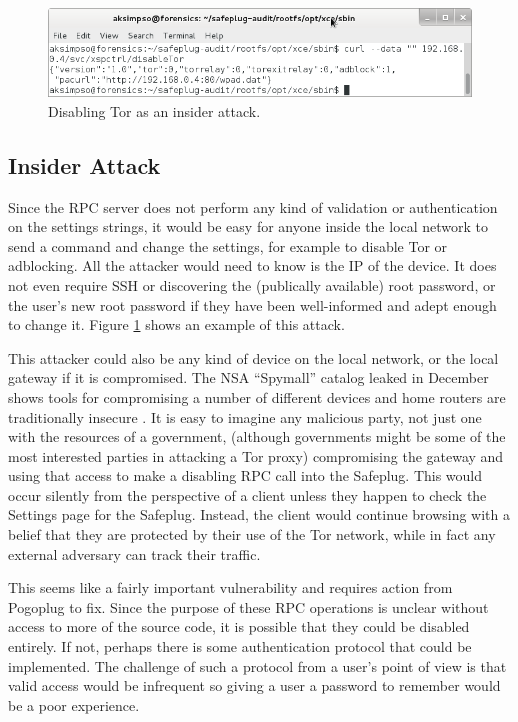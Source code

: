 \documentclass[conference]{IEEEtran}
\begin{document}
\begin{figure}[htb]
\begin{center}
\includegraphics[width=.75\textwidth]{disabletor}
\caption{Disabling Tor as an insider attack.}
\label{disable}
\end{center}
\end{figure}

\subsection{Insider Attack}
Since the RPC server does not perform any kind of validation or authentication on the settings strings, it would be easy for anyone inside the local network to send a command and change the settings, for example to disable Tor or adblocking.  All the attacker would need to know is the IP of the device.  It does not even require SSH or discovering the (publically available) root password, or the user's new root password if they have been well-informed and adept enough to change it.  Figure \ref{disable} shows an example of this attack.

This attacker could also be any kind of device on the local network, or the local gateway if it is compromised.  The NSA ``Spymall'' catalog leaked in December shows tools for compromising a number of different devices and home routers are traditionally insecure \cite{spymall}.  It is easy to imagine any malicious party, not just one with the resources of a government, (although governments might be some of the most interested parties in attacking a Tor proxy) compromising the gateway and using that access to make a disabling RPC call into the Safeplug.  This would occur silently from the perspective of a client unless they happen to check the Settings page for the Safeplug.  Instead, the client would continue browsing with a belief that they are protected by their use of the Tor network, while in fact any external adversary can track their traffic.

This seems like a fairly important vulnerability and requires action from Pogoplug to fix.  Since the purpose of these RPC operations is unclear without access to more of the source code, it is possible that they could be disabled entirely.  If not, perhaps there is some authentication protocol that could be implemented.  The challenge of such a protocol from a user's point of view is that valid access would be infrequent so giving a user a password to remember would be a poor experience.
\end{document}
